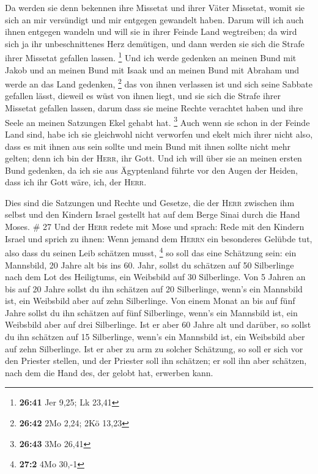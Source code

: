  Da werden sie denn bekennen ihre Missetat und ihrer
Väter Missetat, womit sie sich an mir versündigt und mir entgegen
gewandelt haben.  Darum will ich auch ihnen entgegen
wandeln und will sie in ihrer Feinde Land wegtreiben; da wird sich ja
ihr unbeschnittenes Herz demütigen, und dann werden sie sich die Strafe
ihrer Missetat gefallen lassen. \footnote{\textbf{26:41} Jer 9,25; Lk
  23,41}  Und ich werde gedenken an meinen Bund mit Jakob
und an meinen Bund mit Isaak und an meinen Bund mit Abraham und werde an
das Land gedenken, \footnote{\textbf{26:42} 2Mo 2,24; 2Kö 13,23}
 das von ihnen verlassen ist und sich seine Sabbate
gefallen lässt, dieweil es wüst von ihnen liegt, und sie sich die Strafe
ihrer Missetat gefallen lassen, darum dass sie meine Rechte verachtet
haben und ihre Seele an meinen Satzungen Ekel gehabt hat. \footnote{\textbf{26:43}
  3Mo 26,41}  Auch wenn sie schon in der Feinde Land
sind, habe ich sie gleichwohl nicht verworfen und ekelt mich ihrer nicht
also, dass es mit ihnen aus sein sollte und mein Bund mit ihnen sollte
nicht mehr gelten; denn ich bin der \textsc{Herr}, ihr Gott.
 Und ich will über sie an meinen ersten Bund gedenken, da
ich sie aus Ägyptenland führte vor den Augen der Heiden, dass ich ihr
Gott wäre, ich, der \textsc{Herr}.

 Dies sind die Satzungen und Rechte und Gesetze, die der
\textsc{Herr} zwischen ihm selbst und den Kindern Israel gestellt hat
auf dem Berge Sinai durch die Hand Moses. \# 27  Und der
\textsc{Herr} redete mit Mose und sprach:  Rede mit den
Kindern Israel und sprich zu ihnen: Wenn jemand dem \textsc{Herrn} ein
besonderes Gelübde tut, also dass du seinen Leib schätzen musst,
\footnote{\textbf{27:2} 4Mo 30,-1}  so soll das eine
Schätzung sein: ein Mannsbild, 20 Jahre alt bis ins 60. Jahr, sollst du
schätzen auf 50 Silberlinge nach dem Lot des Heiligtums, 
ein Weibsbild auf 30 Silberlinge.  Von 5 Jahren an bis auf
20 Jahre sollst du ihn schätzen auf 20 Silberlinge, wenn's ein Mannsbild
ist, ein Weibsbild aber auf zehn Silberlinge.  Von einem
Monat an bis auf fünf Jahre sollst du ihn schätzen auf fünf Silberlinge,
wenn's ein Mannsbild ist, ein Weibsbild aber auf drei Silberlinge.
 Ist er aber 60 Jahre alt und darüber, so sollst du ihn
schätzen auf 15 Silberlinge, wenn's ein Mannsbild ist, ein Weibsbild
aber auf zehn Silberlinge.  Ist er aber zu arm zu solcher
Schätzung, so soll er sich vor den Priester stellen, und der Priester
soll ihn schätzen; er soll ihn aber schätzen, nach dem die Hand des, der
gelobt hat, erwerben kann.

